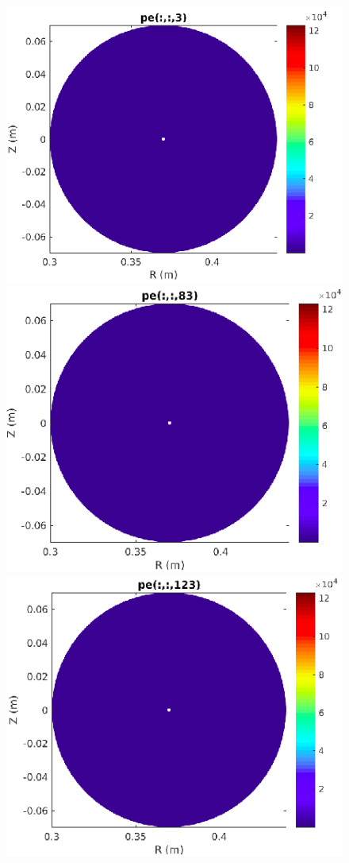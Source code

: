 \documentclass[12pt,oneside,a4paper]{abntex2}
\begin{document}
\begin{figure}[H]
\centering
\includegraphics[scale=0.4]{../SImulacao_breakdown/Adaptacao_nova/explicito/p3.png}  
\includegraphics[scale=0.4]{../SImulacao_breakdown/Adaptacao_nova/explicito/p83.png} 
\includegraphics[scale=0.4]{../SImulacao_breakdown/Adaptacao_nova/explicito/p123.png} 

\end{figure}
\end{document}
